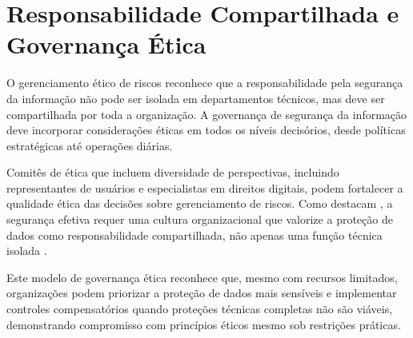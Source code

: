 \section{Responsabilidade Compartilhada e Governança Ética}

O gerenciamento ético de riscos reconhece que a responsabilidade pela segurança da informação não pode ser isolada em departamentos técnicos, mas deve ser compartilhada por toda a organização. A governança de segurança da informação deve incorporar considerações éticas em todos os níveis decisórios, desde políticas estratégicas até operações diárias.

Comitês de ética que incluem diversidade de perspectivas, incluindo representantes de usuários e especialistas em direitos digitais, podem fortalecer a qualidade ética das decisões sobre gerenciamento de riscos. Como destacam \citeauthor{stallings2017cryptography}, a segurança efetiva requer uma cultura organizacional que valorize a proteção de dados como responsabilidade compartilhada, não apenas uma função técnica isolada \cite{stallings2017cryptography}.

Este modelo de governança ética reconhece que, mesmo com recursos limitados, organizações podem priorizar a proteção de dados mais sensíveis e implementar controles compensatórios quando proteções técnicas completas não são viáveis, demonstrando compromisso com princípios éticos mesmo sob restrições práticas. 